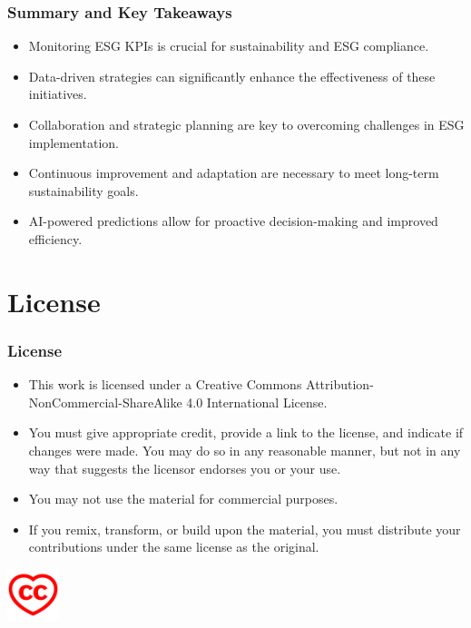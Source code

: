 \documentclass{beamer}
\begin{document}
\begin{frame}
\frametitle{Summary and Key Takeaways}
\begin{itemize}
    \item Monitoring ESG KPIs is crucial for sustainability and ESG compliance.
    \item Data-driven strategies can significantly enhance the effectiveness of these initiatives.
    \item Collaboration and strategic planning are key to overcoming challenges in ESG implementation.
    \item Continuous improvement and adaptation are necessary to meet long-term sustainability goals.
  \item AI-powered predictions allow for proactive decision-making and improved efficiency.
\end{itemize}
\end{frame}

\section{License}

\begin{frame}
\frametitle{License}
\begin{itemize}
    \item This work is licensed under a Creative Commons Attribution-NonCommercial-ShareAlike 4.0 International License.
    \item You must give appropriate credit, provide a link to the license, and indicate if changes were made. You may do so in any reasonable manner, but not in any way that suggests the licensor endorses you or your use.
    \item You may not use the material for commercial purposes.
    \item If you remix, transform, or build upon the material, you must distribute your contributions under the same license as the original.
\end{itemize}
\includegraphics[width=1.5cm]{heart.red.png}

\end{frame}
\end{document}
